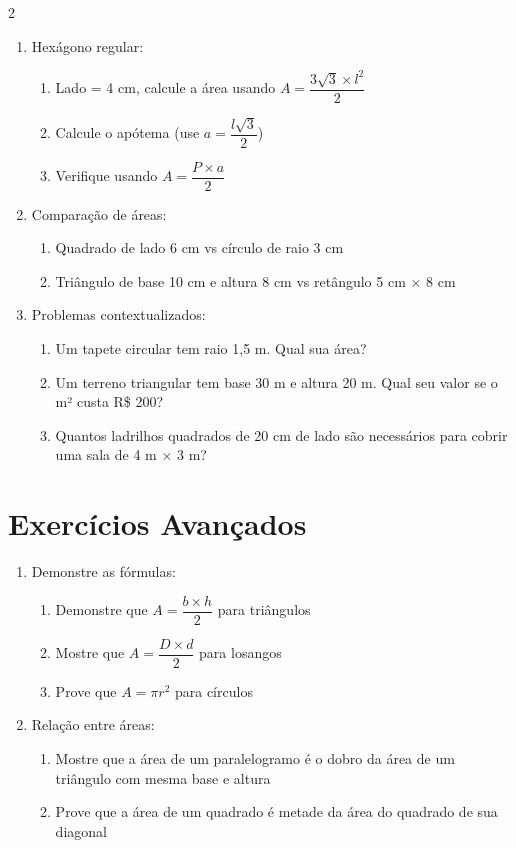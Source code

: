 \documentclass[11pt]{article}
\begin{document}
\begin{multicols}{2}
\begin{enumerate}[leftmargin=*]
\begin{enumerate}[leftmargin=*, start=6]
\item Hexágono regular:
\begin{enumerate}[label=\alph*)]
\item Lado = 4 cm, calcule a área usando $A = \dfrac{3\sqrt{3} \times l^2}{2}$
\item Calcule o apótema (use $a = \dfrac{l\sqrt{3}}{2}$)
\item Verifique usando $A = \dfrac{P \times a}{2}$
\end{enumerate}

\item Comparação de áreas:
\begin{enumerate}[label=\alph*)]
\item Quadrado de lado 6 cm vs círculo de raio 3 cm
\item Triângulo de base 10 cm e altura 8 cm vs retângulo 5 cm × 8 cm
\end{enumerate}

\item Problemas contextualizados:
\begin{enumerate}[label=\alph*)]
\item Um tapete circular tem raio 1,5 m. Qual sua área?
\item Um terreno triangular tem base 30 m e altura 20 m. Qual seu valor se o m² custa R\$ 200?
\item Quantos ladrilhos quadrados de 20 cm de lado são necessários para cobrir uma sala de 4 m × 3 m?
\end{enumerate}

\end{enumerate}

\section*{Exercícios Avançados}

\begin{enumerate}[leftmargin=*, start=11]

\item Demonstre as fórmulas:
\begin{enumerate}[label=\alph*)]
\item Demonstre que $A = \dfrac{b \times h}{2}$ para triângulos
\item Mostre que $A = \dfrac{D \times d}{2}$ para losangos
\item Prove que $A = \pi r^2$ para círculos
\end{enumerate}

\item Relação entre áreas:
\begin{enumerate}[label=\alph*)]
\item Mostre que a área de um paralelogramo é o dobro da área de um triângulo com mesma base e altura
\item Prove que a área de um quadrado é metade da área do quadrado de sua diagonal
\end{enumerate}


\end{enumerate}
\end{enumerate}
\end{multicols}
\end{document}
